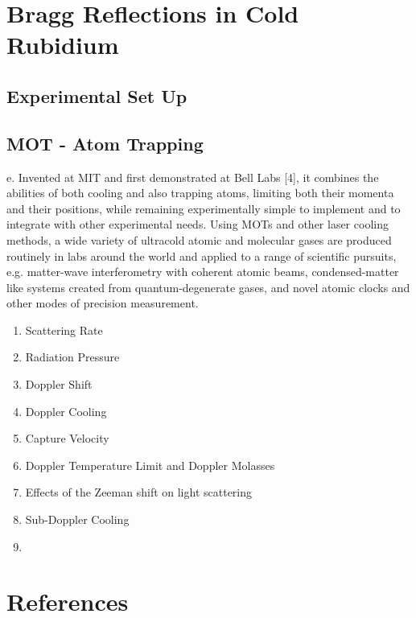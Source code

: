 \documentclass[10pt]{article}
\begin{document}
\section*{Bragg Reflections in Cold Rubidium}




\subsection*{Experimental Set Up}


\subsection*{MOT - Atom Trapping}
e. Invented at MIT and first demonstrated at Bell Labs [4], it combines the abilities of both cooling and also trapping atoms, limiting both their momenta and their positions, while remaining experimentally simple to implement and to integrate with other experimental needs. Using MOTs and other laser cooling methods, a wide variety of ultracold atomic and molecular gases are produced routinely in labs around the world and applied to a range of scientific pursuits, e.g. matter-wave interferometry with coherent atomic beams, condensed-matter like systems created from quantum-degenerate gases, and novel atomic clocks and other modes of precision measurement.

\begin{enumerate}
    \item Scattering Rate
    \item Radiation Pressure
    \item Doppler Shift
    \item Doppler Cooling
    \item Capture Velocity
    \item Doppler Temperature Limit and Doppler Molasses
    \item Effects of the Zeeman shift on light scattering
    \item Sub-Doppler Cooling
    \item 
\end{enumerate}

\newpage
\section*{References}


\end{document}
